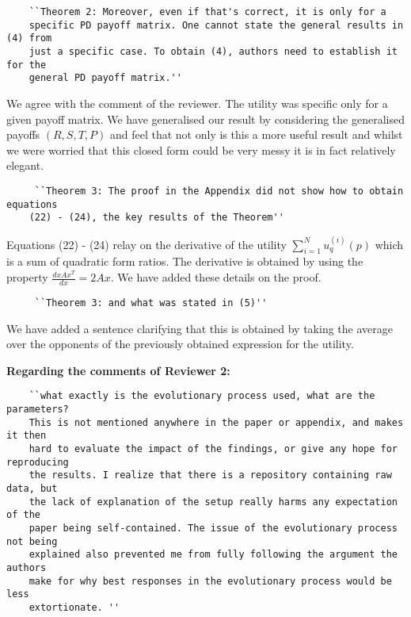 \documentclass{article}
\begin{document}
\begin{verbatim}
    ``Theorem 2: Moreover, even if that's correct, it is only for a
    specific PD payoff matrix. One cannot state the general results in (4) from
    just a specific case. To obtain (4), authors need to establish it for the
    general PD payoff matrix.''
\end{verbatim}

We agree with the comment of the reviewer. The utility was
specific only for a given payoff matrix. We have generalised our result by
considering the generalised payoffs \((R, S, T, P)\) and feel that not only is this a more useful 
result and whilst we were worried that this closed form could be very messy it is in fact relatively elegant.

\begin{verbatim}
     ``Theorem 3: The proof in the Appendix did not show how to obtain equations
    (22) - (24), the key results of the Theorem''
\end{verbatim}

Equations (22) - (24) relay on the derivative of the utility \(\sum\limits_{i=1}
^ N  u_q^{(i)}(p)\) which is a sum of quadratic form ratios. The derivative is
obtained by using the property \(\frac{d x A x^T}{dx} =  2Ax\). We have added
these details on the proof.

\begin{verbatim}
     ``Theorem 3: and what was stated in (5)''
\end{verbatim}

We have added a sentence clarifying that this is obtained by taking the average
over the opponents of the previously obtained expression for the utility.

\textbf{Regarding the comments of Reviewer 2:}

\begin{verbatim}
    ``what exactly is the evolutionary process used, what are the parameters?
    This is not mentioned anywhere in the paper or appendix, and makes it then
    hard to evaluate the impact of the findings, or give any hope for reproducing
    the results. I realize that there is a repository containing raw data, but
    the lack of explanation of the setup really harms any expectation of the
    paper being self-contained. The issue of the evolutionary process not being
    explained also prevented me from fully following the argument the authors
    make for why best responses in the evolutionary process would be less
    extortionate. ''
\end{verbatim}
\end{document}
